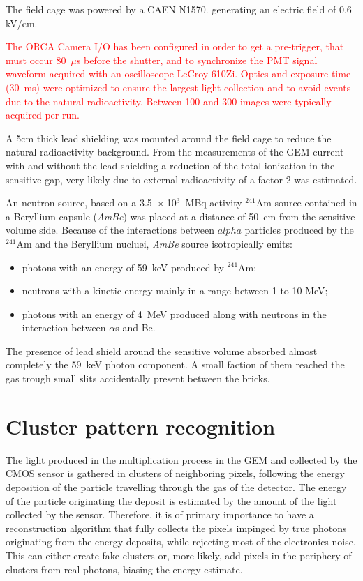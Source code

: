 \documentclass[12pt]{iopart}
\begin{document}
The field cage was powered by a CAEN N1570.\cite{CAENN1570} generating an electric field  of 0.6 kV/cm. 


\textcolor{red}{The ORCA Camera I/O has been configured in order to get a pre-trigger, that must occur 80~$\mu$s before the shutter, and to synchronize the PMT signal waveform acquired with an oscilloscope LeCroy 610Zi. Optics and exposure time (30~ms) were optimized to ensure the largest light collection and to avoid events due to the natural radioactivity. Between 100 and 300 images were typically acquired per run. }

A  5cm thick lead shielding was mounted around the \lemon field cage to reduce the natural radioactivity background. From the measurements of the GEM current with and without the lead shielding a reduction of the total ionization in the sensitive gap, very likely due to external radioactivity of a factor 2 was estimated.

 An neutron source, based on a 3.5~$\times~$10$^3$~MBq activity  $^{241}$Am source contained in a Beryllium capsule ({\it AmBe}) was placed at a distance of 50~cm from the sensitive volume side. 
 Because of the interactions between $alpha$ particles produced by the $^{241}$Am and the Beryllium nucluei, {\it AmBe} source isotropically emits:
 \begin{itemize}
     \item photons with an energy of 59~keV produced by $^{241}$Am;
     \item neutrons with a kinetic energy mainly in a range between 1 to 10 MeV;
     \item photons with an energy of 4~MeV produced along with neutrons in the interaction between $\alpha$s and Be.
 \end{itemize}
 
The presence of lead shield around the sensitive volume absorbed almost completely the 59~keV photon component. A small faction of them reached the gas trough small slits accidentally present between the bricks.
 

\clearpage
 
\section{Cluster pattern recognition}
\label{sec:clustering}
The light produced in the multiplication process in the GEM and
collected by the CMOS sensor is gathered in clusters of neighboring
pixels, following the energy deposition of the particle travelling
through the gas of the detector. The energy of the particle
originating the deposit is estimated by the amount of the light
collected by the sensor.  Therefore, it is of primary importance to
have a reconstruction algorithm that fully collects the pixels
impinged by true photons originating from the energy deposits, while
rejecting most of the electronics noise. This can either create fake
clusters or, more likely, add pixels in the periphery of clusters from
real photons, biasing the energy estimate.
\end{document}
